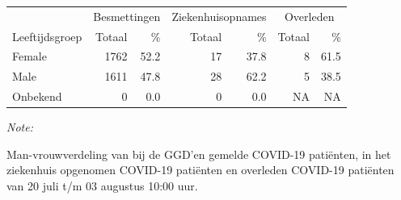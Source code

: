 \documentclass[
  english,
  man,floatsintext]{apa6}
\begin{document}
\begin{table}[H]
\centering\begingroup\fontsize{11}{13}\selectfont

\begin{threeparttable}
\begin{tabular}{lrrrrrr}
\toprule
\multicolumn{1}{c}{ } & \multicolumn{2}{c}{Besmettingen} & \multicolumn{2}{c}{Ziekenhuisopnames} & \multicolumn{2}{c}{Overleden} \\
\cmidrule(l{3pt}r{3pt}){2-3} \cmidrule(l{3pt}r{3pt}){4-5} \cmidrule(l{3pt}r{3pt}){6-7}
Leeftijdsgroep & Totaal & \% & Totaal & \% & Totaal & \%\\
\midrule
Female & 1762 & 52.2 & 17 & 37.8 & 8 & 61.5\\
Male & 1611 & 47.8 & 28 & 62.2 & 5 & 38.5\\
Onbekend & 0 & 0.0 & 0 & 0.0 & NA & NA\\
\bottomrule
\end{tabular}
\begin{tablenotes}
\item \textit{Note: } 
\item Man-vrouwverdeling van bij de GGD’en gemelde COVID-19 patiënten, in het ziekenhuis opgenomen COVID-19 patiënten en overleden COVID-19 patiënten van 20 juli t/m 03 augustus 10:00 uur.
\end{tablenotes}
\end{threeparttable}
\endgroup{}
\end{table}
\newpage
\end{document}
